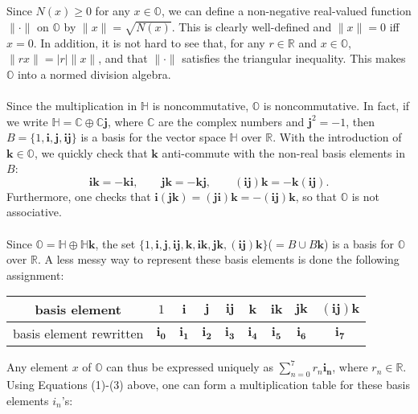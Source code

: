 \documentclass[12pt]{article}
\newcommand{\R}{\mathbb{R}}
\newcommand{\C}{\mathbb{C}}
\newcommand{\Q}{\mathbb{H}}
\newcommand{\Oc}{\mathbb{O}}
\newcommand{\norm}[1]{\lVert #1 \rVert}
\newcommand{\abs}[1]{\lvert #1 \rvert}
\begin{document}
\\\\
Since $N(x)\ge0$ for any $x\in\Oc$, we can define a non-negative
real-valued function $\norm{\cdot}$ on $\Oc$ by $\norm{x}=
\sqrt{N(x)}$. This is clearly well-defined and $\norm{x}=0$ iff
$x=0$.  In addition, it is not hard to see that, for any $r\in\R$
and $x\in\Oc$, $\norm{rx}= \abs{r}\norm{x}$, and that $\norm{\cdot}$
satisfies the triangular inequality. This makes $\Oc$ into a normed
division algebra.
\\\\
Since the multiplication in $\Q$ is noncommutative, $\Oc$ is
noncommutative.  In fact, if we write $\Q=\C\oplus\C\mathbf{j}$,
where $\C$ are the complex numbers and $\mathbf{j}^2=-1$, then
$B=\lbrace 1,\mathbf{i},\mathbf{j},\mathbf{ij}\rbrace$ is a basis
for the vector space $\Q$ over $\mathbb{R}$.  With the introduction
of $\mathbf{k}\in\Oc$, we quickly check that $\mathbf{k}$
anti-commute with the non-real basis elements in $B$:
$$\mathbf{ik=-ki},\qquad\mathbf{jk=-kj},\qquad\mathbf{(ij)k=-k(ij)}.$$
Furthermore, one checks that $\mathbf{i(jk)=(ji)k=-(ij)k}$, so that
$\Oc$ is not associative.
\\\\
Since $\Oc=\Q\oplus\Q\mathbf{k}$, the set $\lbrace
1,\mathbf{i,j,ij,k,ik,jk,(ij)k}\rbrace$($=B\cup B\mathbf{k}$) is a
basis for $\Oc$ over $\R$. A less messy way to represent these basis
elements is done the following assignment:
\begin{center}
\begin{tabular}{|c|c|c|c|c|c|c|c|c|}
\hline basis element & $1$ & $\mathbf{i}$ & $\mathbf{j}$ &
$\mathbf{ij}$ & $\mathbf{k}$ & $\mathbf{ik}$ & $\mathbf{jk}$ &
$\mathbf{(ij)k}$\\
\hline basis element rewritten & $\mathbf{i_0}$ & $\mathbf{i_1}$ &
$\mathbf{i_2}$ & $\mathbf{i_3}$ & $\mathbf{i_4}$ & $\mathbf{i_5}$
& $\mathbf{i_6}$ & $\mathbf{i_7}$ \\
\hline
\end{tabular}
\end{center}
Any element $x$ of $\Oc$ can thus be expressed uniquely as
$\sum_{n=0}^{7}r_n\mathbf{i_n}$, where $r_n\in\R$.  Using Equations
(1)-(3) above, one can form a multiplication table for these basis
elements $i_n$'s:
\end{document}
